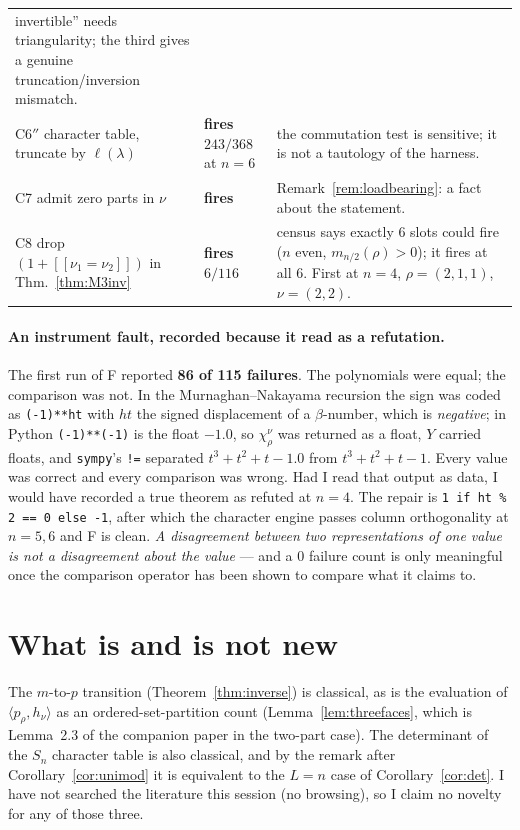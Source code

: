 \documentclass[11pt]{article}
\theoremstyle{definition}
\newcommand{\bb}[1]{[\![#1]\!]}
\newcommand{\lam}{\lambda}
\begin{document}
\begin{center}
\begin{tabular}{llp{5.4cm}}
invertible'' needs triangularity; the third gives a genuine truncation/inversion mismatch.\\
C6$''$ character table, truncate by $\ell(\lam)$ & \textbf{fires} $243/368$ at $n=6$ & the
commutation test is sensitive; it is not a tautology of the harness.\\
C7 admit zero parts in $\nu$ & \textbf{fires} & Remark~\ref{rem:loadbearing}: a fact about the
statement.\\
C8 drop $(1+\bb{\nu_1=\nu_2})$ in Thm.~\ref{thm:M3inv} & \textbf{fires} $6/116$ & census says
exactly $6$ slots could fire ($n$ even, $m_{n/2}(\rho)>0$); it fires at all $6$. First at
$n=4$, $\rho=(2,1,1)$, $\nu=(2,2)$.\\
\bottomrule
\end{tabular}
\end{center}

\paragraph{An instrument fault, recorded because it read as a refutation.}
The first run of F reported \textbf{86 of 115 failures}. The polynomials were equal; the comparison
was not. In the Murnaghan--Nakayama recursion the sign was coded as \verb|(-1)**ht| with $ht$ the
signed displacement of a $\beta$-number, which is \emph{negative}; in Python \verb|(-1)**(-1)| is
the float $-1.0$, so $\chi^\nu_\rho$ was returned as a float, $Y$ carried floats, and
\verb|sympy|'s \verb|!=| separated $t^3+t^2+t-1.0$ from $t^3+t^2+t-1$. Every value was correct and
every comparison was wrong. Had I read that output as data, I would have recorded a true theorem as
refuted at $n=4$. The repair is \verb|1 if ht % 2 == 0 else -1|, after which the character engine
passes column orthogonality at $n=5,6$ and F is clean. \emph{A disagreement between two
representations of one value is not a disagreement about the value} --- and a $0$ failure count is
only meaningful once the comparison operator has been shown to compare what it claims to.

\section{What is and is not new}

The $m$-to-$p$ transition (Theorem~\ref{thm:inverse}) is classical, as is the evaluation of
$\langle p_\rho,h_\nu\rangle$ as an ordered-set-partition count (Lemma~\ref{lem:threefaces}, which
is Lemma~2.3 of the companion paper in the two-part case). The determinant of the $S_n$ character
table is also classical, and by the remark after Corollary~\ref{cor:unimod} it is equivalent to the
$L=n$ case of Corollary~\ref{cor:det}. I have not searched the literature this session (no browsing),
so I claim no novelty for any of those three.
\end{document}
